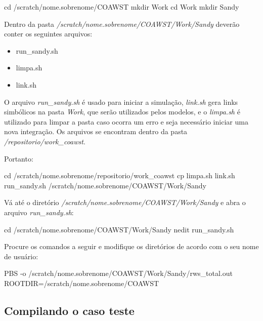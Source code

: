 \begin{bashcode}
cd /scratch/nome.sobrenome/COAWST
mkdir Work
cd Work
mkdir Sandy
\end{bashcode}
\bigskip

\noindent Dentro da pasta \textit{/scratch/nome.sobrenome/COAWST/Work/Sandy} deverão conter os seguintes arquivos:
\bigskip

\begin{itemize}
\item run\_sandy.sh
\item limpa.sh
\item link.sh
\end{itemize}
\bigskip

\noindent O arquivo \textit{run\_sandy.sh} é usado para iniciar a simulação, \textit{link.sh} gera links simbólicos na pasta \textit{Work}, que serão utilizados pelos modelos, e o \textit{limpa.sh} é utilizado para limpar a pasta caso ocorra um erro e seja necessário iniciar uma nova integração. Os arquivos se encontram dentro da pasta \textit{/repositorio/work\_coawst}.
\bigskip

\noindent Portanto:

\bigskip

\begin{bashcode}
cd /scratch/nome.sobrenome/repositorio/work_coawst
cp limpa.sh link.sh run_sandy.sh /scratch/nome.sobrenome/COAWST/Work/Sandy
\end{bashcode}
\bigskip

\noindent Vá até o diretório \textit{/scratch/nome.sobrenome/COAWST/Work/Sandy} e abra o arquivo \textit{run\_sandy.sh}:
\bigskip

\begin{bashcode}
cd /scratch/nome.sobrenome/COAWST/Work/Sandy
nedit run_sandy.sh
\end{bashcode}
\bigskip

\noindent Procure os comandos a seguir e modifique os diretórios de acordo com o seu nome de usuário:
\bigskip

\begin{bashcode}
PBS -o /scratch/nome.sobrenome/COAWST/Work/Sandy/rws_total.out
ROOTDIR=/scratch/nome.sobrenome/COAWST
\end{bashcode}
\bigskip


\subsection{Compilando o caso teste}
\bigskip

